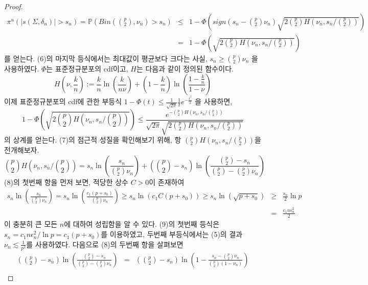 \begin{proof}
    \begin{eqnarray}
      \pi^u(|s(\Sigma, \delta_n)| > s_n) = \mathbb{P} \left( Bin({p \choose 2}, \nu_n) > s_n \right) &\leq& 1 - \Phi \left( sign(s_n - {p \choose 2} \nu_n) \sqrt{2 {p \choose 2} H( \nu_n, s_n / {p \choose 2})} \right) \nonumber \\
      & = & 1 - \Phi \left( \sqrt{2 {p \choose 2} H( \nu_n, s_n / {p \choose 2})} \right)
    \end{eqnarray}
    를 얻는다. (6)의 마지막 등식에서는 최대값이 평균보다 크다는 사실, $s_n \geq {p \choose 2} \nu_n$ 을 사용하였다. $\Phi$는 표준정규분포의 cdf이고, $H$는 다음과 같이 정의된 함수이다.
    \[
    H(\nu, \frac{k}{n}) := \frac{k}{n} \ln{ \left( \frac{k}{n \nu} \right) } + \left( 1 - \frac{k}{n} \right) \ln{\left( \frac{1 - \frac{k}{n}}{1 - \nu} \right)}
    \]
    이제 표준정규분포의 cdf에 관한 부등식 $1 - \Phi (t) \leq \frac{1}{\sqrt{2\pi}} \frac{1}{t} e^{-\frac{t^2}{2}}$ 을 사용하면,
    \begin{equation}
      1 - \Phi \left( \sqrt{2 {p \choose 2} H ( \nu_n, s_n / {p \choose 2})} \right) \leq \frac{e^{- {p \choose 2}H(\nu_n, s_n/{p \choose 2})}}{\sqrt{2\pi}\sqrt{2{p \choose 2}H(\nu_n, s_n/{p \choose 2})}}
    \end{equation}
    의 상계를 얻는다. (7)의 점근적 성질을 확인해보기 위해, 항 ${p \choose 2} H(\nu_n, s_n/{p \choose 2})$을 전개해보자.
    \begin{equation}
      {p \choose 2} H (\nu_n, s_n/{p \choose 2}) = s_n \ln{\left( \frac{s_n}{{p \choose 2} \nu_n} \right)} + \left( {p \choose 2} - s_n \right) \ln{\left( \frac{{p \choose 2} - s_n}{{p \choose 2} - {p \choose 2}\nu_n} \right)}
    \end{equation}
    (8)의 첫번째 항을 먼저 보면, 적당한 상수 $C > 0$이 존재하여
    \begin{eqnarray}
      s_n \ln{\left( \frac{s_n}{{p \choose 2} \nu_n} \right)} = s_n \ln{\left( \frac{c_1(p + s_0)}{{p \choose 2}\nu_n} \right)} \geq s_n \ln{\left( c_1 C (p + s_0) \right)} \geq s_n \ln{\left( \sqrt{p + s_0} \right)} &\geq& \frac{s_n}{2} \ln{p}  \\
      &=& \frac{c_1 n \epsilon_n^2}{2}
    \end{eqnarray}
    이 충분히 큰 모든 $n$에 대하여 성립함을 알 수 있다. (9)의 첫번째 등식은 $s_n = c_1 n \epsilon_n^2 / \ln{p} = c_1(p + s_0)$를 이용하였고, 두번째 부등식에서는 (5)의 결과 $\nu_n \lesssim \frac{1}{p^2}$를 사용하였다. 다음으로 (8)의 두번째 항을 살펴보면
    \begin{eqnarray}
      \left( {p \choose 2} - s_n \right) \ln{\left( \frac{{p \choose 2} - s_n}{{p \choose 2} - {p \choose 2}\nu_n} \right)} &=& \left( {p \choose 2} - s_n \right) \ln{\left( 1 - \frac{s_n - {p \choose 2} \nu_n}{{p \choose 2}(1 - \nu_n)} \right)} \\

\end{eqnarray}
\end{proof}
